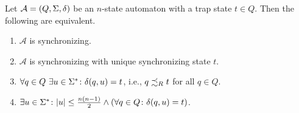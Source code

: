 \begin{theorem}
	\label{prelim:thm:sync_trap_state}
	Let $\mathcal A = (Q, \Sigma, \delta)$ be an $n$-state automaton with a trap state $t \in Q$.
	Then the following are equivalent.
	
	\begin{enumerate}
		\item \label{prelim:subclasses:thm:trap:item:sync} $\mathcal A$ is synchronizing.
		
		\item \label{prelim:subclasses:thm:trap:item:syncunique} $\mathcal A$ is synchronizing with unique synchronizing state $t$.
		
		\item \label{prelim:subclasses:thm:trap:item:unique-max} $\forall q \in Q \  \exists u \in \Sigma^* \colon \delta(q,u) = t$, i.e., $q \precsim_R t$ for all $q \in Q$.
		
		\item \label{prelim:subclasses:thm:trap:item:bound} $\exists u \in \Sigma^* \colon |u| \le \frac{n(n-1)}{2} \land ( \forall q \in Q \colon \delta(q,u) = t )$. 
	\end{enumerate}	
\end{theorem}
